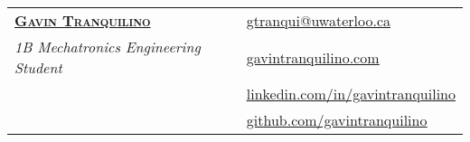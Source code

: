 \documentclass[letterpaper]{article}
\begin{document}
\linespread{1.25}




\begin{center}
    \begin{tabularx}{\textwidth}{@{}X X@{}}
        \textbf{\Huge \scshape \href{https://www.gavintranquilino.com}{Gavin Tranquilino}} & 
        \textbf{\hfill} \href{mailto:gtranqui@uwaterloo.ca}{\underline{gtranqui@uwaterloo.ca}} \\
        \textit{\Large 1B Mechatronics Engineering Student} & \textbf{\hfill} \href{https://www.gavintranquilino.com}{\underline{gavintranquilino.com}} \\
        & \textbf{\hfill} \href{https://linkedin.com/in/gavintranquilino}{\underline{linkedin.com/in/gavintranquilino}} \\
        & \textbf{\hfill} \href{https://github.com/gavintranquilino}{\underline{github.com/gavintranquilino}}
    \end{tabularx}
\end{center}
\end{document}
